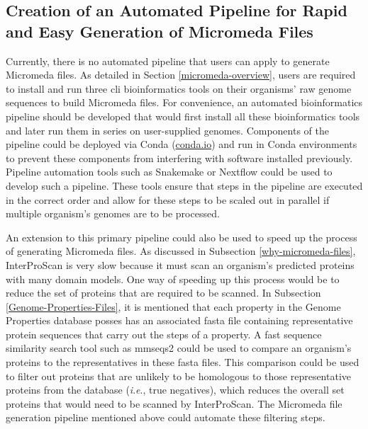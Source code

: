 \subsection{Creation of an Automated Pipeline for Rapid and Easy Generation of 
Micromeda Files} \label{pipeline-development}

Currently, there is no automated pipeline that users can apply to generate 
Micromeda files. As detailed in Section \ref{micromeda-overview}, users are 
required to install and run three \gls{cli} bioinformatics tools on their 
organisms' raw genome sequences to build Micromeda files. For convenience, an 
automated bioinformatics pipeline should be developed that would first install 
all these bioinformatics tools and later run them in series on user-supplied 
genomes. Components of the pipeline could be deployed via Conda 
(\href{http://conda.io}{conda.io}) and run in Conda environments to prevent 
these components from interfering with software installed previously. Pipeline 
automation tools such as Snakemake \cite{koster2012snakemake} or Nextflow 
\cite{di2017nextflow} could be used to develop such a pipeline. These tools 
ensure that steps in the pipeline are executed in the correct order and allow 
for these steps to be scaled out in parallel if multiple organism's genomes are 
to be processed.

An extension to this primary pipeline could also be used to speed up the process 
of generating Micromeda files. As discussed in Subsection 
\ref{why-micromeda-files}, InterProScan is very slow because it must scan an 
organism's predicted proteins with many domain models. One way of speeding up 
this process would be to reduce the set of proteins that are required to be 
scanned. In Subsection \ref{Genome-Properties-Files}, it is mentioned that each 
property in the Genome Properties database posses has an associated \gls{fasta} file 
containing representative protein sequences that carry out the steps of a 
property. A fast sequence similarity search tool such as \gls{mmseqs2} 
\cite{steinegger2017mmseqs2} could be used to compare an organism's proteins to 
the representatives in these \gls{fasta} files. This comparison could be used to 
filter out proteins that are unlikely to be homologous to those representative 
proteins from the database (\textit{i}.\textit{e}., true negatives), which reduces the overall set 
proteins that would need to be scanned by InterProScan. The Micromeda file 
generation pipeline mentioned above could automate these filtering steps.

